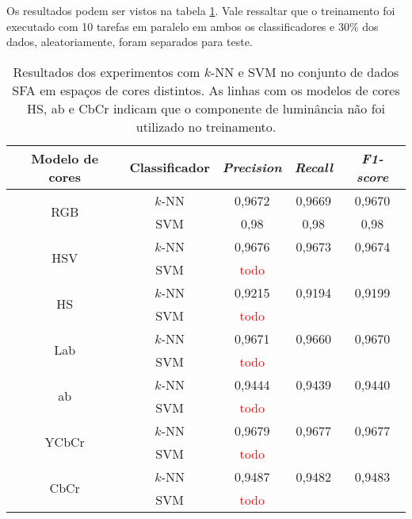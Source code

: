 Os resultados podem ser vistos na tabela \ref{tab:resultados_experimento_dois}. Vale ressaltar que o treinamento foi executado com 10 tarefas em paralelo em ambos os classificadores e 30\% dos dados, aleatoriamente, foram separados para teste.
\begin{table}[!htpb]
\centering
\begin{small}
\setlength{\tabcolsep}{8pt}

\begin{tabular}{|c|c|c|c|c|}\hline
 Modelo de cores & Classificador & \emph{Precision} & \emph{Recall} & \emph{F1-score} \\ \hline
 \multirow{2}{*}{RGB}   & $k$-NN  & 0,9672 & 0,9669 & 0,9670 \\ \cline{2-5}
                        & SVM     & 0,98 & 0,98 & 0,98 \\ \hline
 \multirow{2}{*}{HSV}   & $k$-NN  & 0,9676 & 0,9673 & 0,9674 \\ \cline{2-5}
                        & SVM     & \textcolor{red}{todo} && \\ \hline
 \multirow{2}{*}{HS}    & $k$-NN  & 0,9215 & 0,9194 & 0,9199 \\ \cline{2-5}
                        & SVM     & \textcolor{red}{todo} && \\ \hline
 \multirow{2}{*}{Lab}   & $k$-NN  & 0,9671 & 0,9660 & 0,9670 \\ \cline{2-5}
                        & SVM     & \textcolor{red}{todo} && \\ \hline
 \multirow{2}{*}{ab}    & $k$-NN  & 0,9444 & 0,9439 & 0,9440 \\ \cline{2-5}
                        & SVM     & \textcolor{red}{todo} && \\ \hline
 \multirow{2}{*}{YCbCr} & $k$-NN  & 0,9679 & 0,9677 & 0,9677 \\ \cline{2-5}
                        & SVM     & \textcolor{red}{todo} && \\ \hline
 \multirow{2}{*}{CbCr}  & $k$-NN  & 0,9487 & 0,9482 & 0,9483 \\ \cline{2-5}
                        & SVM     & \textcolor{red}{todo} && \\ \hline

\end{tabular}
\end{small}
\caption[Resultados dos experimentos com $k$-NN e SVM no conjunto de dados SFA em espaços de cores distintos]{Resultados dos experimentos com $k$-NN e SVM no conjunto de dados SFA em espaços de cores distintos. As linhas com os modelos de cores HS, ab e CbCr indicam que o componente de luminância não foi utilizado no treinamento.}
\label{tab:resultados_experimento_dois}
\end{table}


